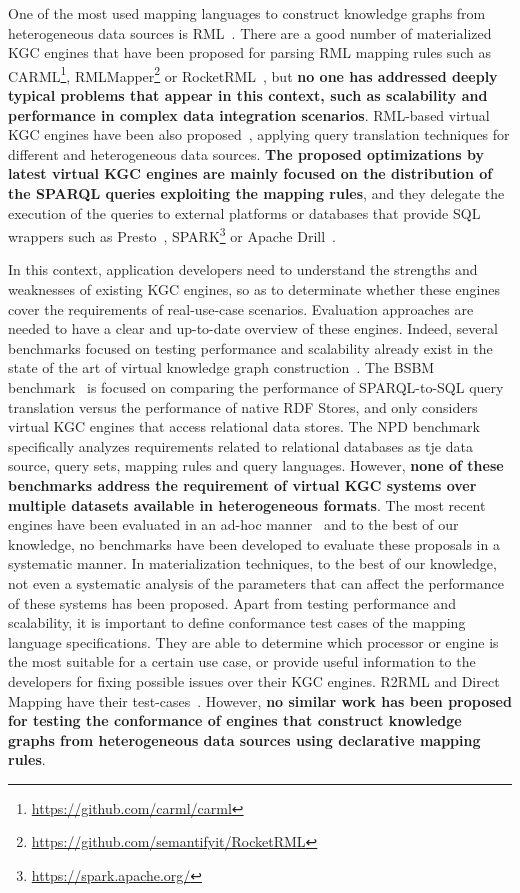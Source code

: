 One of the most used mapping languages to construct knowledge graphs from heterogeneous data sources is RML~\citep{dimou2014rml}. There are a good number of materialized KGC engines that have been proposed for parsing RML mapping rules such as CARML\footnote{\url{https://github.com/carml/carml}}, RMLMapper\footnote{\url{https://github.com/semantifyit/RocketRML}} or RocketRML~\citep{csimcsek2019rocketrml}, but \textbf{no one has addressed deeply typical problems that appear in this context, such as scalability and performance in complex data integration scenarios}. RML-based virtual KGC engines have been also proposed~\citep{endris2019ontario,mami2019squerall}, applying query translation techniques for different and heterogeneous data sources. \textbf{The proposed optimizations by latest virtual KGC engines are mainly focused on the distribution of the SPARQL queries exploiting the mapping rules}, and they delegate the execution of the queries to external platforms or databases that provide SQL wrappers such as Presto~\citep{bershad1988presto}, SPARK\footnote{\url{https://spark.apache.org/}} or Apache Drill~\citep{hausenblas2013apache}.

In this context, application developers need to understand the strengths and weaknesses of existing KGC engines, so as to determinate whether these engines cover the requirements of real-use-case scenarios. Evaluation approaches are needed to have a clear and up-to-date overview of these engines. Indeed, several benchmarks focused on testing performance and scalability already exist in the state of the art of virtual knowledge graph construction~\citep{bizer2009berlin,lanti2015npd}. The BSBM benchmark~\citep{bizer2009berlin} is focused on comparing the performance of SPARQL-to-SQL query translation versus the performance of native RDF Stores, and only considers virtual KGC engines that access relational data stores. The NPD benchmark~\citep{lanti2015npd} specifically analyzes requirements related to relational databases as tje data source, query sets, mapping rules and query languages. However, \textbf{none of these benchmarks address the requirement of virtual KGC systems over multiple datasets available in heterogeneous formats}. The most recent engines have been evaluated in an ad-hoc manner~\citep{endris2019ontario,mami2019querying} and to the best of our knowledge, no benchmarks have been developed to evaluate these proposals in a systematic manner. In materialization techniques, to the best of our knowledge, not even a systematic analysis of the parameters that can affect the performance of these systems has been proposed. Apart from testing performance and scalability, it is important to define conformance test cases of the mapping language specifications. They are able to determine which processor or engine is the most suitable for a certain use case, or provide useful information to the developers for fixing possible issues over their KGC engines. R2RML and Direct Mapping have their test-cases~\citep{R2RML_test_cases}. However, \textbf{no similar work has been proposed for testing the conformance of engines that construct knowledge graphs from heterogeneous data sources using declarative mapping rules}.

